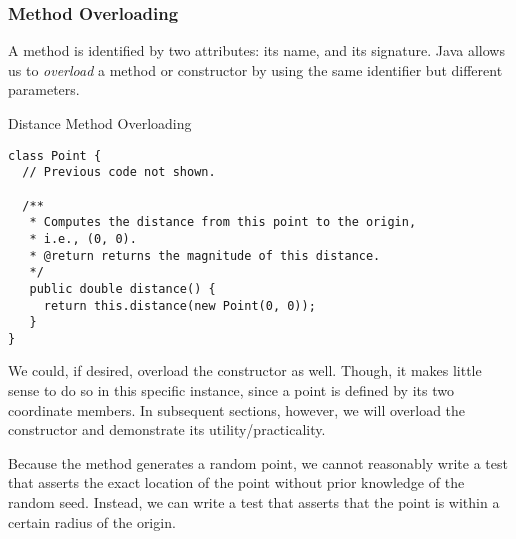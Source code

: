 \subsubsection*{Method Overloading}
A method is identified by two attributes: its name, and its signature. Java allows us to \textit{overload} a method or constructor by using the same identifier but different parameters.


\begin{cl}[]{Distance Method Overloading}
\begin{lstlisting}[language=MyJava]
class Point {
  // Previous code not shown.
  
  /**
   * Computes the distance from this point to the origin,
   * i.e., (0, 0).
   * @return returns the magnitude of this distance.
   */
   public double distance() {
     return this.distance(new Point(0, 0));
   }
}
\end{lstlisting}
\end{cl} 

We could, if desired, overload the  constructor as well. Though, it makes little sense to do so in this specific instance, since a point is defined by its two coordinate members. In subsequent sections, however, we will overload the constructor and demonstrate its utility/practicality.


Because the  method generates a random point, we cannot reasonably write a test that asserts the exact location of the point without prior knowledge of the random seed. Instead, we can write a test that asserts that the point is within a certain radius of the origin. 

